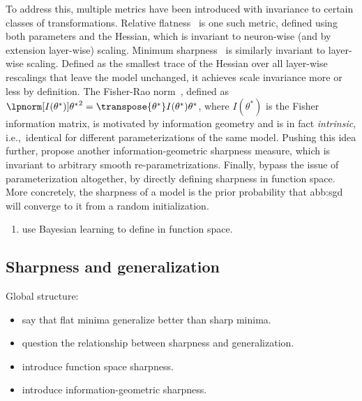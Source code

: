 To address this, multiple metrics have been introduced
with invariance to certain classes of transformations.
Relative flatness~\cite{petzkaRelativeFlatnessGeneralization2021}
is one such metric, defined using both parameters and the Hessian,
which is invariant to neuron-wise (and by extension layer-wise) scaling.
Minimum sharpness~\cite{ibayashiMinimumSharpnessScaleinvariant2021}
is similarly invariant to layer-wise scaling.
Defined as the smallest trace of the Hessian over all layer-wise rescalings
that leave the model unchanged, it achieves scale invariance more or less by definition.
The Fisher-Rao norm~\cite{liangFisherRaoMetricGeometry2019},
defined as
\(
\lpnorm[I(\theta^{\ast})]{\theta^{\ast}}^{2} =
\transpose{{\theta^{\ast}}}I(\theta^{\ast})\theta^{\ast}
\),
where \(I(\theta^{\ast})\) is the Fisher information matrix,
is motivated by information geometry and is in fact \emph{intrinsic},
i.e.,\ identical for different parameterizations of the same model.
Pushing this idea further, \citet{jangReparametrizationInvariantSharpnessMeasure2022}
propose another information-geometric sharpness measure,
which is invariant to arbitrary smooth re-parametrizations.
Finally, \citet{zhangWhyFlatnessDoes2021} bypass the issue of parameterization altogether,
by directly defining sharpness in function space.
More concretely, the sharpness of a model is the prior probability that
\gls{abb:sgd} will converge to it from a random initialization.

\begin{enumerate}
	\item  use Bayesian learning to define in function space.
\end{enumerate}

\subsection{Sharpness and generalization}\label{sub:sharpness:generalization}
\cite{chenBootstrapGeneralizationAbility2023}
Global structure:
\begin{itemize}
	\item \citet{keskarLargeBatchTrainingDeep2022} say that flat minima generalize better than sharp minima.
	\item \citet{%
		      dinhSharpMinimaCan2017,%
		      zhangWhyFlatnessDoes2021,%
		      andriushchenkoModernLookRelationship2023%
	      }
	      question the relationship between sharpness and generalization.
	\item \citet{zhangWhyFlatnessDoes2021} introduce function space sharpness.
	\item \citet{jangReparametrizationInvariantSharpnessMeasure2022}
	      introduce information-geometric sharpness.
\end{itemize}

